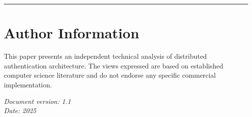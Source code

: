 \documentclass[11pt,a4paper]{article}
\begin{document}
\vspace{1cm}
\noindent\rule{\textwidth}{0.4pt}

\section*{Author Information}

\noindent
This paper presents an independent technical analysis of distributed authentication architecture. The views expressed are based on established computer science literature and do not endorse any specific commercial implementation.

\vspace{0.5cm}
\noindent
\textit{Document version: 1.1}\\
\textit{Date: 2025}
\end{document}
